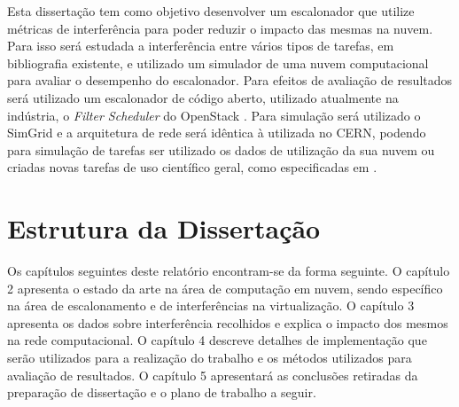 Esta dissertação tem como objetivo desenvolver um escalonador que utilize métricas de interferência para poder reduzir o impacto das mesmas na nuvem. Para isso será estudada a interferência entre vários tipos de tarefas, em bibliografia existente, e utilizado um simulador de uma nuvem computacional para avaliar o desempenho do escalonador. Para efeitos de avaliação de resultados será utilizado um escalonador de código aberto, utilizado atualmente na indústria, o \textit{Filter Scheduler} do OpenStack \cite{gong2012nova}. Para simulação será utilizado o SimGrid e a arquitetura de rede será idêntica à utilizada no CERN, podendo para simulação de tarefas ser utilizado os dados de utilização da sua nuvem ou criadas novas tarefas de uso científico geral, como especificadas em \cite{mehta2013pegasus}.





\section{Estrutura da Dissertação} \label{sec:struct}

Os capítulos seguintes deste relatório encontram-se da forma seguinte. O capítulo 2 apresenta o estado da arte na área de computação em nuvem, sendo específico na área de escalonamento e de interferências na virtualização. O capítulo 3 apresenta os dados sobre interferência recolhidos e explica o impacto dos mesmos na rede computacional. O capítulo 4 descreve detalhes de implementação que serão utilizados para a realização do trabalho e os métodos utilizados para avaliação de resultados. O capítulo 5 apresentará as conclusões retiradas da preparação de dissertação e o plano de trabalho a seguir.


